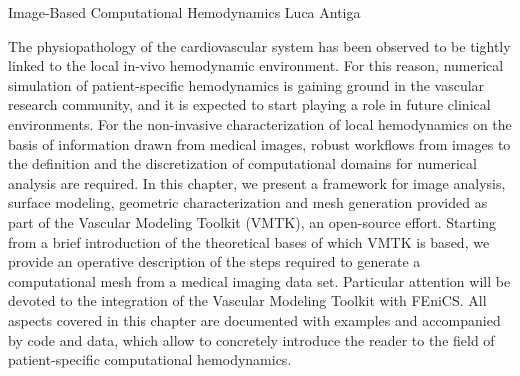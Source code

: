               {Image-Based Computational Hemodynamics}
              {Luca Antiga}

\editornote{[antiga]}

The physiopathology of the cardiovascular system has been observed to  
be tightly linked to the local in-vivo hemodynamic environment. For  
this reason, numerical simulation of patient-specific hemodynamics is  
gaining ground in the vascular research community, and it is expected  
to start playing a role in future clinical environments.
For the non-invasive characterization of local hemodynamics on the  
basis of information drawn from medical images, robust workflows from  
images to the definition and the discretization of computational  
domains for numerical analysis are required.
In this chapter, we present a framework for image analysis, surface  
modeling, geometric characterization and mesh generation provided as  
part of the Vascular Modeling Toolkit (VMTK), an open-source effort.
Starting from a brief introduction of the theoretical bases of which  
VMTK is based, we provide an operative description of the steps  
required to generate a computational mesh from a medical imaging data  
set. Particular attention will be devoted to the integration of the  
Vascular Modeling Toolkit with FEniCS. All aspects covered in this  
chapter are documented with examples and accompanied by code and  
data, which allow to concretely introduce the reader to the field of  
patient-specific computational hemodynamics.



